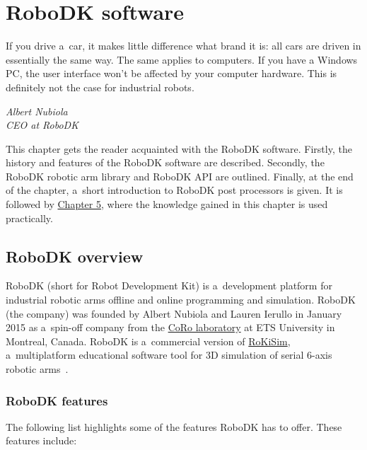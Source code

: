 \chapter{RoboDK software \label{chap:design}}



\epigraph{If you drive a~car, it makes little difference what brand it is: all cars are driven
in essentially the same way. The same applies to computers. If you have a
Windows PC, the user interface won’t be affected by your computer hardware.
This is definitely not the case for industrial robots.}{\textit{Albert Nubiola \\ CEO at RoboDK}}

\par This chapter gets the reader acquainted with the RoboDK software. Firstly, the history and features of the RoboDK software are described. Secondly, the RoboDK robotic arm library and RoboDK API are outlined. Finally, at the end of the chapter, a~short introduction to RoboDK post processors is given. It is followed by  \hyperref[chap:implementation]{Chapter 5}, where the knowledge gained in this chapter is used practically. 

\section{RoboDK overview}

RoboDK (short for Robot Development Kit) is a~development platform for industrial robotic arms offline and online programming and simulation. 
RoboDK (the company) was founded by Albert Nubiola and Lauren Ierullo in January 2015 as a~spin-off company from the \href{https://en.etsmtl.ca/unites-de-recherche/coro/accueil?lang=en-CA}{CoRo laboratory}   at ETS University in Montreal, Canada. RoboDK is a~commercial version of \href{https://www.parallemic.org/RoKiSim.html}{RoKiSim}, a~multiplatform educational software tool for 3D simulation of serial 6-axis robotic arms~\cite{robodkoverview}.

\subsection{RoboDK features}

The following list highlights some of the features RoboDK has to offer. These features include: 

